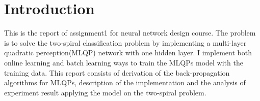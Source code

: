 \section{Introduction}
This is the report of assignment1 for neural network design course.
The problem is to solve the two-spiral classification problem by implementing a multi-layer quadratic perception(MLQP) network with one hidden layer. I implement both online learning and batch learning ways to train the MLQPs model with the training data.
This report consists of derivation of the back-propagation algorithms for MLQPs, description of the implementation and the analysis of experiment result applying the model on the two-spiral problem.


